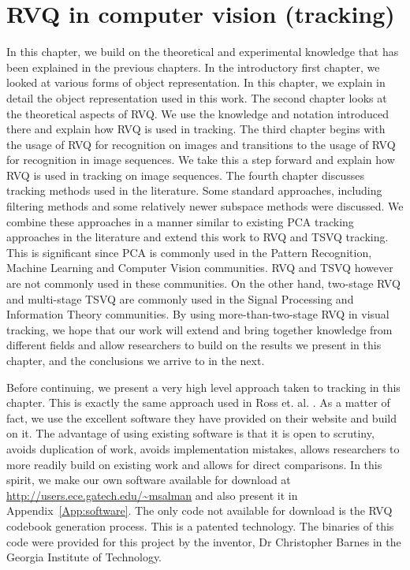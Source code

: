 \chapter{RVQ in computer vision (tracking)}
\label{chap_RVQ_STT}	
In this chapter, we build on the theoretical and experimental knowledge that has been explained in the previous chapters.  In the introductory first chapter, we looked at various forms of object representation.  In this chapter, we explain in detail the object representation used in this work.  The second chapter looks at the theoretical aspects of RVQ.  We use the knowledge and notation introduced there and explain how RVQ is used in tracking.  The third chapter begins with the usage of RVQ for recognition on images and transitions to the usage of RVQ for recognition in image sequences.  We take this a step forward and explain how RVQ is used in tracking on image sequences.  The fourth chapter discusses tracking methods used in the literature.  Some standard approaches, including filtering methods and some relatively newer subspace methods were discussed.  We combine these approaches in a manner similar to existing PCA tracking approaches in the literature and extend this work to RVQ and TSVQ tracking.  This is significant since PCA is commonly used in the Pattern Recognition, Machine Learning and Computer Vision communities.  RVQ and TSVQ however are not commonly used in these communities.  On the other hand, two-stage RVQ and multi-stage TSVQ are commonly used in the Signal Processing and Information Theory communities.  By using more-than-two-stage RVQ in visual tracking, we hope that our work will extend and bring together knowledge from different fields and allow researchers to build on the results we present in this chapter, and the conclusions we arrive to in the next.



Before continuing, we present a very high level approach taken to tracking in this chapter.  This is exactly the same approach used in Ross et. al. \cite{2008_JNL_subspaceTRK_Ross}.  As a matter of fact, we use the excellent software they have provided on their website \cite{2008_SFT_Ross} and build on it.  The advantage of using existing software is that it is open to scrutiny, avoids duplication of work, avoids implementation mistakes, allows researchers to more readily build on existing work and allows for direct comparisons.  In this spirit, we make our own software available for download at \url{http://users.ece.gatech.edu/~msalman} and also present it in Appendix~\ref{App:software}.  The only code not available for download is the RVQ codebook generation process.  This is a patented technology.  The binaries of this code were provided for this project by the inventor, Dr Christopher Barnes in the Georgia Institute of Technology.

